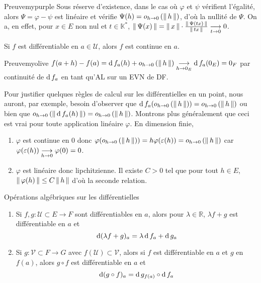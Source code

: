     \begin{demo}{Preuve}{mypurple}
        Sous réserve d’existence, dans le cas où $\varphi$ et $\psi$ vérifient l’égalité, alors $\Psi = \varphi - \psi$ est linéaire et vérifie $\Psi(h) = o_{h \rightarrow 0} \left(\left\lVert\,h\,\right\rVert\right)$, d’où la nullité de $\Psi$. On a, en effet, pour $x \in E$ non nul et $t \in \mathbb{K}^*$, $\left\lVert\,\Psi(x)\,\right\rVert = \left\lVert\,x\,\right\rVert \cdot \frac{\left\lVert\,\Psi(tx)\,\right\rVert}{\left\lVert\,tx\,\right\rVert} \underset{t \rightarrow 0}{\longrightarrow} 0$.
    \end{demo}

    \begin{prop}{}{}
        Si $f$ est différentiable en $a \in \mathcal{U}$, alors $f$ est continue en $a$. 
    \end{prop}

    \begin{demo}{Preuve}{myolive}
        $f(a+h) - f(a) = \operatorname{d} f_a(h) + o_{h \rightarrow 0} \left(\left\lVert\,h\,\right\rVert\right) \underset{h \rightarrow 0_E}{\longrightarrow} \operatorname{d} f_a(0_E) = 0_F$ par continuité de $\operatorname{d} f_a$ en tant qu’AL sur un EVN de DF. 
    \end{demo}

    Pour justifier quelques règles de calcul sur les différentielles en un point, nous auront, par exemple, besoin d’observer que $\operatorname{d} f_a(o_{h \rightarrow 0} \left(\left\lVert\,h\,\right\rVert\right)) = o_{h \rightarrow 0} \left(\left\lVert\,h\,\right\rVert\right)$ ou bien que $o_{h \rightarrow 0} \left(\left\lVert\,\operatorname{d} f_a(h)\,\right\rVert\right) = o_{h \rightarrow 0} \left(\left\lVert\,h\,\right\rVert\right)$. Montrons plus généralement que ceci est vrai pour toute application linéaire $\varphi$. En dimension finie, 
    \begin{enumerate}
        \item $\varphi$ est continue en 0 donc $\varphi(o_{h \rightarrow 0} \left(\left\lVert\,h\,\right\rVert\right)) = h \varphi(\varepsilon(h)) = o_{h \rightarrow 0} \left(\left\lVert\,h\,\right\rVert\right)$ car $\varphi(\varepsilon(h)) \underset{h \rightarrow 0}{\longrightarrow} \varphi(0) = 0$. 
        \item $\varphi$ est linéaire donc lipchitzienne. Il existe $C > 0$ tel que pour tout $h \in E$, $\left\lVert\,\varphi(h)\,\right\rVert \leq C \left\lVert\,h\,\right\rVert$ d’où la seconde relation. 
    \end{enumerate}

    \begin{prop}{Opérations algébriques sur les différentielles}{}
        \begin{enumerate}
            \item Si $f,g : \mathcal{U} \subset E \to F$ sont différentiables en $a$, alors pour $\lambda \in \mathbb{R}$, $\lambda f + g$ est différentiable en $a$ et 
            \[ \operatorname{d} (\lambda f + g)_a = \lambda \operatorname{d} f_a + \operatorname{d} g_a \]   
            \item Si $g : \mathcal{V} \subset F \to G$ avec $f(\mathcal{U}) \subset \mathcal{V}$, alors si $f$ est différentiable en $a$ et $g$ en $f(a)$, alors $g \circ f$ est différentiable en $a$ et 
            \[ \operatorname{d} (g \circ f)_a = \operatorname{d} g_{f(a)} \circ \operatorname{d} f_a \]  
        \end{enumerate}
    \end{prop}

